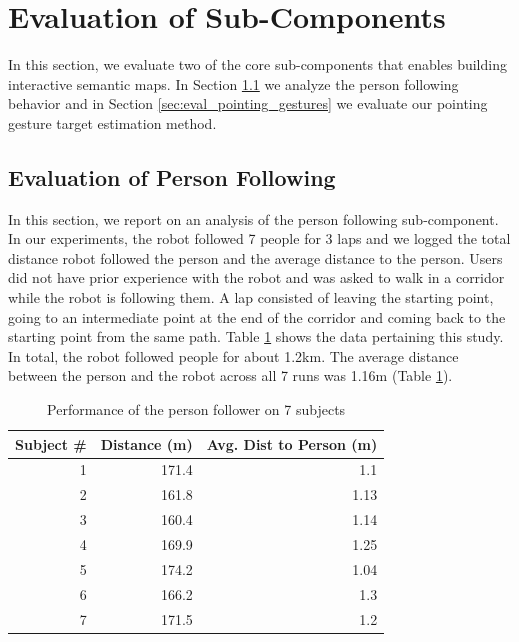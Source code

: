 \documentclass{tADR2e}
\begin{document}
\section{Evaluation of Sub-Components}
\label{sec:evaluation}

In this section, we evaluate two of the core sub-components that enables building interactive semantic maps. In Section \ref{sec:eval_person_following} we analyze the person following behavior and in Section \ref{sec:eval_pointing_gestures} we evaluate our pointing gesture target estimation method.

\subsection{Evaluation of Person Following}
\label{sec:eval_person_following}

In this section, we report on an analysis of the person following sub-component. In our experiments, the robot followed 7 people for 3 laps and we logged the total distance robot followed the person and the average distance to the person. Users did not have prior experience with the robot and was asked to walk in a corridor while the robot is following them. A lap consisted of leaving the starting point, going to an intermediate point at the end of the corridor and coming back to the starting point from the same path. Table \ref{tab:perf} shows the data pertaining this study. In total, the robot followed people for about 1.2km. The average distance between the person and the robot across all 7 runs was 1.16m (Table \ref{tab:perf}).

\begin{table}[!h]
\begin{center}
  \begin{tabular}{| r || r | r |}
    \hline
    Subject \# & Distance (m) & Avg. Dist to Person (m) \\ \hline 
    1 & 171.4  & 1.1\\ \hline
    2 & 161.8  & 1.13\\ \hline
    3 & 160.4  & 1.14\\ \hline
    4 & 169.9  & 1.25\\ \hline
    5 & 174.2  & 1.04\\ \hline
    6 & 166.2  & 1.3\\ \hline
    7 & 171.5  & 1.2\\ \hline
  \end{tabular}
\label{tab:perf}
\end{center}
\caption {Performance of the person follower on 7 subjects}
\end{table}
\end{document}
